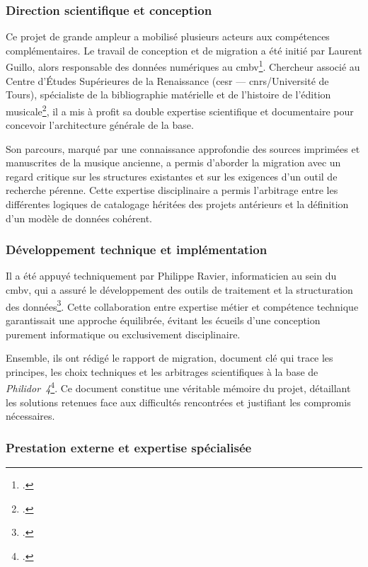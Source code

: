 \subsubsection{Direction scientifique et conception}

Ce projet de grande ampleur a mobilisé plusieurs acteurs aux compétences complémentaires. Le travail de conception et de migration a été initié par Laurent Guillo, alors responsable des données numériques au \gls{cmbv}\footcite{BaseDonneesPHILIDOR42024}. Chercheur associé au Centre d'Études Supérieures de la Renaissance (\gls{cesr} — \gls{cnrs}/Université de Tours), spécialiste de la bibliographie matérielle et de l'histoire de l'édition musicale\footcite{GuilloLaurentCESR}, il a mis à profit sa double expertise scientifique et documentaire pour concevoir l'architecture générale de la base.

Son parcours, marqué par une connaissance approfondie des sources imprimées et manuscrites de la musique ancienne, a permis d'aborder la migration avec un regard critique sur les structures existantes et sur les exigences d'un outil de recherche pérenne. Cette expertise disciplinaire a permis l'arbitrage entre les différentes logiques de catalogage héritées des projets antérieurs et la définition d'un modèle de données cohérent.

\subsubsection{Développement technique et implémentation}

Il a été appuyé techniquement par Philippe Ravier, informaticien au sein du \gls{cmbv}, qui a assuré le développement des outils de traitement et la structuration des données\footcite{BaseDonneesPHILIDOR42024}. Cette collaboration entre expertise métier et compétence technique garantissait une approche équilibrée, évitant les écueils d'une conception purement informatique ou exclusivement disciplinaire.

Ensemble, ils ont rédigé le rapport de migration, document clé qui trace les principes, les choix techniques et les arbitrages scientifiques à la base de \textit{Philidor~4}\footcite{laurentguilloRapportMigrationAnciennes2022}. Ce document constitue une véritable mémoire du projet, détaillant les solutions retenues face aux difficultés rencontrées et justifiant les compromis nécessaires.

\subsubsection{Prestation externe et expertise spécialisée}

